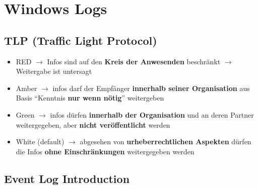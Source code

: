 


\section{Windows Logs}

\subsection{TLP (Traffic Light Protocol)}
\begin{itemize}
    \item RED $\rightarrow$ Infos sind auf den \textbf{Kreis der Anwesenden} beschränkt $\rightarrow$ Weitergabe ist untersagt
    \item Amber $\rightarrow$ infos darf der Empfänger \textbf{innerhalb seiner Organisation} aus Basis “Kenntnis \textbf{nur wenn nötig}” weitergeben
    \item Green $\rightarrow$ infos dürfen \textbf{innerhalb der Organisation} und an deren Partner weitergegeben, aber \textbf{nicht veröffentlicht} werden
    \item White (default) $\rightarrow$ abgesehen von \textbf{urheberrechtlichen Aspekten} dürfen die Infos \textbf{ohne Einschränkungen} weitergegeben werden
\end{itemize}

\subsection{Event Log Introduction}

